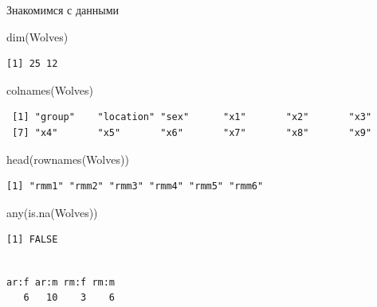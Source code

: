 \documentclass[
  ignorenonframetext,
  russian,
]{beamer}
\newenvironment{Shaded}{\begin{snugshade}}{\end{snugshade}}
\newcommand{\FunctionTok}[1]{\textcolor[rgb]{0.28,0.35,0.67}{#1}}
\newcommand{\NormalTok}[1]{\textcolor[rgb]{0.00,0.23,0.31}{#1}}
\newcommand{\SpecialCharTok}[1]{\textcolor[rgb]{0.37,0.37,0.37}{#1}}
\begin{document}
\begin{frame}[fragile]{Знакомимся с данными}
\protect{}\label{ux437ux43dux430ux43aux43eux43cux438ux43cux441ux44f-ux441-ux434ux430ux43dux43dux44bux43cux438}
\scriptsize

\begin{Shaded}
\begin{Highlighting}[]
\FunctionTok{dim}\NormalTok{(Wolves)}
\end{Highlighting}
\end{Shaded}

\begin{verbatim}
[1] 25 12
\end{verbatim}

\begin{Shaded}
\begin{Highlighting}[]
\FunctionTok{colnames}\NormalTok{(Wolves)}
\end{Highlighting}
\end{Shaded}

\begin{verbatim}
 [1] "group"    "location" "sex"      "x1"       "x2"       "x3"      
 [7] "x4"       "x5"       "x6"       "x7"       "x8"       "x9"      
\end{verbatim}

\begin{Shaded}
\begin{Highlighting}[]
\FunctionTok{head}\NormalTok{(}\FunctionTok{rownames}\NormalTok{(Wolves))}
\end{Highlighting}
\end{Shaded}

\begin{verbatim}
[1] "rmm1" "rmm2" "rmm3" "rmm4" "rmm5" "rmm6"
\end{verbatim}

\begin{Shaded}
\begin{Highlighting}[]
\FunctionTok{any}\NormalTok{(}\FunctionTok{is.na}\NormalTok{(Wolves))}
\end{Highlighting}
\end{Shaded}

\begin{verbatim}
[1] FALSE
\end{verbatim}

\begin{Shaded}
\end{Shaded}

\begin{verbatim}

ar:f ar:m rm:f rm:m 
   6   10    3    6 
\end{verbatim}
\end{frame}
\end{document}
